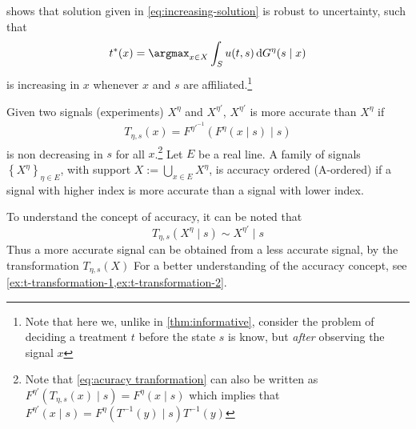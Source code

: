 \documentclass[11pt,a4paper,twoside]{article}
\begin{document}
\textcite{Athey2002}  shows that solution given in \cref{eq:increasing-solution} is robust to uncertainty, such that
\[
	t^*(x)=\argmax_{x\in X}\int_Su(t,s)\dif G^\eta(s\mid x)
\]
is increasing in \(x\)  whenever \(x\) and \(s\) are affiliated.\footnote{Note that here we, unlike in \cref{thm:informative}, consider the problem of deciding a treatment \(t\) before the state \(s\) is know, but \emph{after} observing the signal \(x\) }

\begin{definition}\label{def:accuracy}
\parencite{Persico2000} Given two signals (experiments) \(X^{\eta}\) and \(X^{\eta'}\),  \(X^{\eta'}\) is more accurate than \(X^{\eta}\) if
\begin{align}
    	T_{\eta,s}(x)=F^{\eta'^{-1}}(F^{\eta}(x\mid s)\mid s)\label{eq:acuracy tranformation}
\end{align}
is non decreasing in \(s\) for all \(x\).\footnote{Note that \cref{eq:acuracy tranformation} can also be written as \(F^{\eta'}(T_{\eta,s}(x)\mid s)=F^{\eta}(x\mid s)\) which implies that \(F^{\eta'}(x\mid s)=F^\eta(T^{-1}(y)\mid s)T^{-1}(y)\)} Let \(E\) be a real line. A family of signals \(\left \{ X^{\eta}\right \} _{\eta\in E}\), with support \(X:=\bigcup_{x\in E}X^\eta\), is accuracy ordered (A-ordered) if a signal with higher index is more accurate than a signal with lower index.
\end{definition}

To understand the concept of accuracy, it can be noted that
\[
	T_{\eta,s}(X^{\eta}\mid s)\sim X^{\eta'}\mid s
\]
Thus a more accurate signal can be obtained from a less accurate signal, by the transformation \(T_{\eta,s}(X)\)  For a better understanding of the accuracy concept, see \cref{ex:t-transformation-1,ex:t-transformation-2}.
\end{document}
